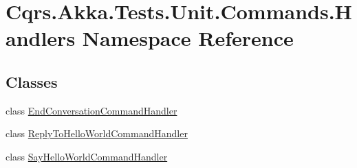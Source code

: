 \hypertarget{namespaceCqrs_1_1Akka_1_1Tests_1_1Unit_1_1Commands_1_1Handlers}{}\section{Cqrs.\+Akka.\+Tests.\+Unit.\+Commands.\+Handlers Namespace Reference}
\label{namespaceCqrs_1_1Akka_1_1Tests_1_1Unit_1_1Commands_1_1Handlers}
\subsection*{Classes}
\begin{DoxyCompactItemize}
\item 
class \hyperlink{classCqrs_1_1Akka_1_1Tests_1_1Unit_1_1Commands_1_1Handlers_1_1EndConversationCommandHandler}{End\+Conversation\+Command\+Handler}
\item 
class \hyperlink{classCqrs_1_1Akka_1_1Tests_1_1Unit_1_1Commands_1_1Handlers_1_1ReplyToHelloWorldCommandHandler}{Reply\+To\+Hello\+World\+Command\+Handler}
\item 
class \hyperlink{classCqrs_1_1Akka_1_1Tests_1_1Unit_1_1Commands_1_1Handlers_1_1SayHelloWorldCommandHandler}{Say\+Hello\+World\+Command\+Handler}
\end{DoxyCompactItemize}
